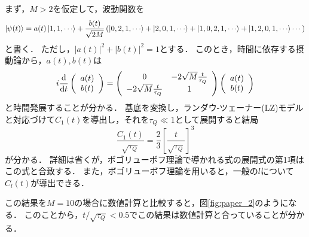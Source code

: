\documentclass[a4paper,11pt]{jsarticle}
\begin{document}
まず，$M>2$を仮定して，波動関数を
\begin{equation}
  \ket{\psi(t)} = a(t) \ket{1,1,\cdots} + \frac{b(t)}{\sqrt{2M}} \left(\ket{0,2,1,\cdots} + \ket{2,0,1,\cdots} + \ket{1,0,2,1,\cdots} + \ket{1,2,0,1,\cdots} \cdots \right)
\end{equation}
と書く．
ただし，$\left|a(t)\right|^2+\left|b(t)\right|^2=1$とする．
このとき，時間に依存する摂動論から，$a(t),b(t)$は
\begin{equation}
  i\dv{t} 
  \left(
  \begin{array}{c}
    a(t) \\
    b(t) \\
  \end{array}
  \right)
  = \left(
  \begin{array}{cc}
    0 & -2\sqrt{M}\frac{t}{\tau_Q}\\
    -2\sqrt{M}\frac{t}{\tau_Q} & 1\\
  \end{array}
  \right)
  \left(
  \begin{array}{c}
    a(t) \\
    b(t) \\
  \end{array}
  \right)
\end{equation}
と時間発展することが分かる．
基底を変換し，ランダウ-ツェーナー(LZ)モデルと対応づけて$C_1(t)$を導出し，それを$\tau_Q \ll 1$として展開すると結局
\begin{equation}
  \frac{C_1(t)}{\sqrt{\tau_Q}} = \frac{2}{3}\left[\frac{t}{\sqrt{\tau_Q}}\right]^{3} \label{c1}
\end{equation}
が分かる．
詳細は省くが，ボゴリューボフ理論で導かれる式の展開式の第1項はこの式と合致する．
また，ボゴリューボフ理論を用いると，一般の$l$について$C_l(t)$が導出できる．

この結果を$M=10$の場合に数値計算と比較すると，図\ref{fig:paper_2}のようになる．
このことから，$t/\sqrt{\tau_Q} < 0.5$でこの結果は数値計算と合っていることが分かる．
\end{document}
